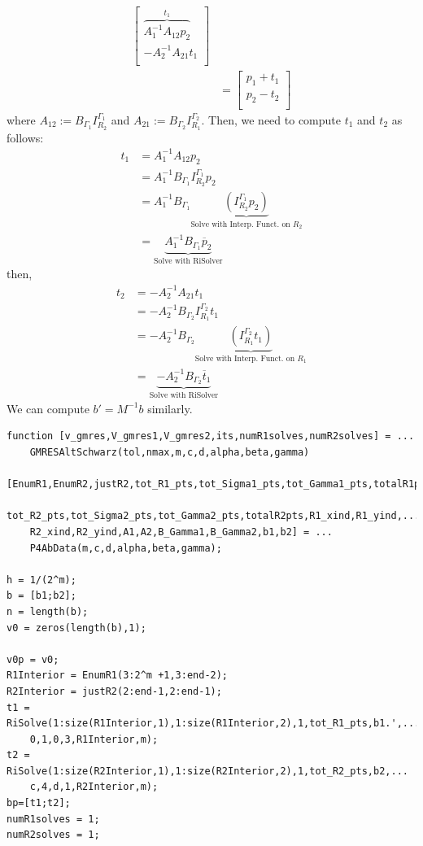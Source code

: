 \documentclass[12pt]{article}
\begin{document}
\begin{itemize}
\begin{align*}
\begin{bmatrix}
	\overbrace{A_1^{-1}A_{12}p_2}^{t_1} \\
	-A_2^{-1}A_{21}t_1 \\
	\end{bmatrix}\\
&= \begin{bmatrix}
p_1 + t_1 \\
p_2 - t_2 \\
\end{bmatrix}
\end{align*}
where $A_{12} := B_{\Gamma_1}I_{R_2}^{\Gamma_1}$ and $A_{21} :=B_{\Gamma_2}I_{R_1}^{\Gamma_2}$.  Then, we need to compute $t_1$ and $t_2$ as follows:
\begin{align*}
t_1 &= A_1^{-1}A_{12}p_2 \\
&= A_1^{-1}B_{\Gamma_1}I_{R_2}^{\Gamma_1}p_2 \\
&= A_1^{-1}B_{\Gamma_1}\underbrace{\left(I_{R_2}^{\Gamma_1}p_2\right)}_{\text{Solve with Interp. Funct. on $R_2$}} \\
&= \underbrace{A_1^{-1}B_{\Gamma_1}\overline{p}_2}_{\text{Solve with RiSolver}}
\end{align*}
then,
\begin{align*}
t_2 &= -A_2^{-1}A_{21}t_1 \\
&= -A_2^{-1}B_{\Gamma_2}I_{R_1}^{\Gamma_2}t_1 \\
&= -A_2^{-1}B_{\Gamma_2}\underbrace{\left(I_{R_1}^{\Gamma_2}t_1\right)}_{\text{Solve with Interp. Funct. on $R_1$}} \\
&= \underbrace{-A_2^{-1}B_{\Gamma_2}\overline{t}_1}_{\text{Solve with RiSolver}} 
\end{align*}
We can compute $b' = M^{-1}b$ similarly.\\

\lstset{language=matlab,frame=single}
\begin{lstlisting}[caption=GMRES with Alternating Schwarz Preconditioner]
function [v_gmres,V_gmres1,V_gmres2,its,numR1solves,numR2solves] = ...
    GMRESAltSchwarz(tol,nmax,m,c,d,alpha,beta,gamma)

[EnumR1,EnumR2,justR2,tot_R1_pts,tot_Sigma1_pts,tot_Gamma1_pts,totalR1pts,...
    tot_R2_pts,tot_Sigma2_pts,tot_Gamma2_pts,totalR2pts,R1_xind,R1_yind,...
    R2_xind,R2_yind,A1,A2,B_Gamma1,B_Gamma2,b1,b2] = ...
    P4AbData(m,c,d,alpha,beta,gamma);

h = 1/(2^m);
b = [b1;b2];
n = length(b);
v0 = zeros(length(b),1);

v0p = v0;
R1Interior = EnumR1(3:2^m +1,3:end-2);
R2Interior = justR2(2:end-1,2:end-1);
t1 = RiSolve(1:size(R1Interior,1),1:size(R1Interior,2),1,tot_R1_pts,b1.',...
    0,1,0,3,R1Interior,m);
t2 = RiSolve(1:size(R2Interior,1),1:size(R2Interior,2),1,tot_R2_pts,b2,...
    c,4,d,1,R2Interior,m);
bp=[t1;t2];
numR1solves = 1;
numR2solves = 1;



\end{lstlisting}
\end{itemize}
\end{document}
